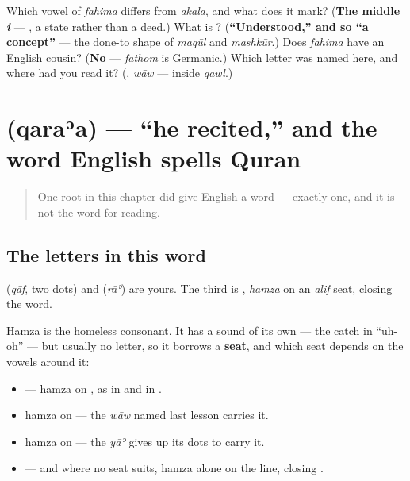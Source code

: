\begin{tcolorbox}[breakable,colback=teal!4,colframe=teal!35!black,title={Before you move on}]
Which vowel of \emph{fahima} differs from \emph{akala}, and what does it mark? (\textbf{The middle \emph{i}} — \textbf{}, a state rather than a deed.) What is \textbf{}? (\textbf{\textquotedblleft{}Understood,\textquotedblright{} and so \textquotedblleft{}a concept\textquotedblright{}} — the done-to shape of \emph{maqūl} and \emph{mashkūr}.) Does \emph{fahima} have an English cousin? (\textbf{No} — \emph{fathom} is Germanic.) Which letter was named here, and where had you read it? (\textbf{}, \emph{wāw} — inside \emph{qawl}.)
\end{tcolorbox}
\section[\texorpdfstring{\ar{قرأ} (qaraʾa)}{قرأ (qaraʾa)}]{ (qaraʾa) — \textquotedblleft{}he recited,\textquotedblright{} and the word English spells Quran}

\label{lesson:AR-C31-qaraa}



\begin{quote}
One root in this chapter did give English a word — exactly one, and it is not the word for reading.
\end{quote}

\subsection*{The letters in this word}
\textbf{} (\emph{qāf}, two dots) and \textbf{} (\emph{rāʾ}) are yours. The third is \textbf{}, \emph{hamza} on an \emph{alif} seat, closing the word.

Hamza is the homeless consonant. It has a sound of its own — the catch in \textquotedblleft{}uh-oh\textquotedblright{} — but usually no letter, so it borrows a \textbf{seat}, and which seat depends on the vowels around it:

\begin{itemize}
\raggedright
  \item \textbf{} — hamza on \textbf{}, as in \textbf{} and in \textbf{}.
  \item hamza on \textbf{} — the \emph{wāw} named last lesson carries it.
  \item hamza on \textbf{} — the \emph{yāʾ} gives up its dots to carry it.
  \item \textbf{} — and where no seat suits, hamza alone on the line, closing \textbf{}.
\end{itemize}

